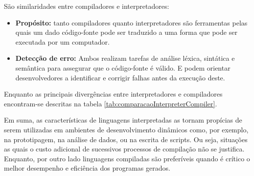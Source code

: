  {
	São similaridades entre compiladores e interpretadores:

	\begin{itemize}
		\item \textbf{Propósito:} tanto compiladores quanto interpretadores são
		      ferramentas pelas quais um dado código-fonte pode ser traduzido a
		      uma forma que pode ser executada por um computador.

		\item \textbf{Detecção de erro:} Ambos realizam tarefas de análise
		      léxica, sintática e semântica para assegurar que o código-fonte é
		      válido. E podem orientar desenvolvedores a identificar e corrigir
		      falhas antes da execução deste.
	\end{itemize}

	Enquanto as principais divergências entre interpretadores e compiladores
	encontram-se descritas na tabela \ref{tab:comparacaoInterpreterCompiler}.

	Em suma, as características de linguagens interpretadas as tornam propícias
	de serem utilizadas em ambientes de desenvolvimento dinâmicos como, por
	exemplo, na prototipagem, na análise de dados, ou na escrita de scripts. Ou
	seja, situações as quais o custo adicional de sucessivos processos de
	compilação não se justifica. Enquanto, por outro lado linguagens compiladas
	são preferíveis quando é crítico o melhor desempenho e eficiência dos
	programas gerados.

}
